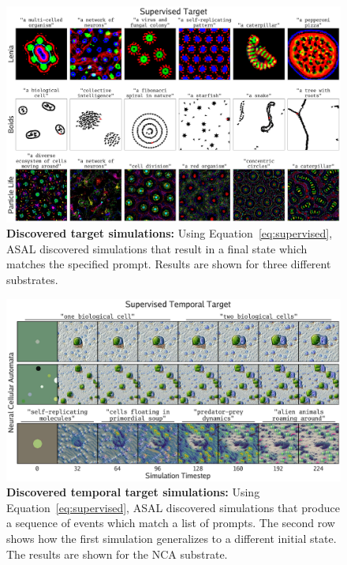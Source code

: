 \documentclass{article}
\begin{document}
\begin{figure}[h]
  \centering
  \includegraphics[width=1.0\linewidth]{figs/supervised_3x6_compressed.pdf}
  \caption{
    \textbf{Discovered target simulations:}
    Using Equation~\ref{eq:supervised}, ASAL discovered simulations that result in a final state which matches the specified prompt.
    Results are shown for three different substrates.
  }
  \label{fig:supervised}
\end{figure}

\begin{figure}[htp]
    \centering
    \includegraphics[width=\textwidth]{figs/nca_temporal_compressed.pdf}
    \caption{
    \textbf{Discovered temporal target simulations: }
    Using Equation~\ref{eq:supervised}, ASAL discovered simulations that produce a sequence of events which match a list of prompts.
    The second row shows how the first simulation generalizes to a different initial state.
    The results are shown for the NCA substrate.
  }
  \label{fig:nca_temporal}
\end{figure}
\end{document}
